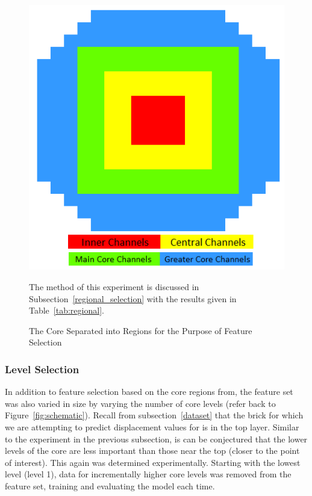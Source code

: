 \begin{figure}[h]
	\centering
	\includegraphics[scale=0.7]{Figures/core_regions.png}
	\caption{The Core Separated into Regions for the Purpose of Feature Selection} {The method of this experiment is discussed in Subsection~\ref{regional_selection} with the results given in Table~\ref{tab:regional}. }
	\label{fig:regions}
\end{figure}

\subsubsection{Level Selection} \label{level_selection}

In addition to feature selection based on the core regions from, the feature set was also varied in size by varying the number of core levels (refer back to Figure~\ref{fig:schematic}). Recall from subsection~\ref{dataset} that the brick for which we are attempting to predict displacement values for is in the top layer. Similar to the experiment in the previous subsection, is can be conjectured that the lower levels of the core are less important than those near the top (closer to the point of interest). This again was determined experimentally. Starting with the lowest level (level 1), data for incrementally higher core levels was removed from the feature set, training and evaluating the model each time. 



